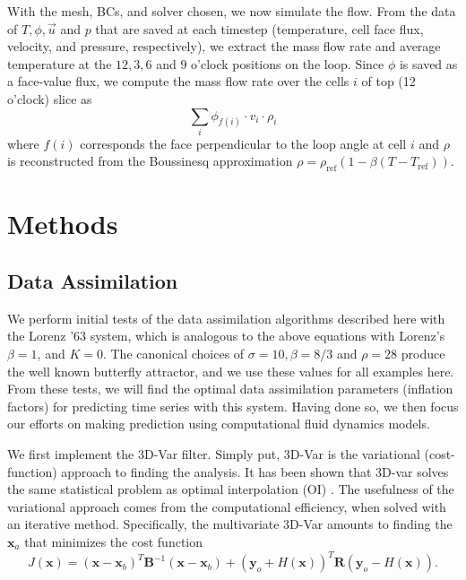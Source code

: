 \documentclass[10pt,letterpaper]{article}
\newcommand{\rhoref}{\rho_{\text{ref}}}
\newcommand{\mbx}{\mathbf{x}}
\newcommand{\mby}{\mathbf{y}}
\newcommand{\mbB}{\mathbf{B}}
\newcommand{\mbR}{\mathbf{R}}
\begin{document}
With the mesh, BCs, and solver chosen, we now simulate the flow.
From the data of $T,\phi,\vec{u}$ and $p$ that are saved at each timestep (temperature, cell face flux, velocity, and pressure, respectively), we extract the mass flow rate and average temperature at the $12,3,6$ and $9$ o'clock positions on the loop.
Since $\phi$ is saved as a face-value flux, we compute the mass flow rate over the cells $i$ of top (12 o'clock) slice as
\begin{equation} \sum _i\phi_{f(i)} \cdot v_i \cdot \rho_i\end{equation}
where $f(i)$ corresponds the face perpendicular to the loop angle at cell $i$ and $\rho$ is reconstructed from the Boussinesq approximation $\rho = \rhoref (1-\beta(T-T_\text{ref}))$.

\section*{Methods}

\subsection*{Data Assimilation}

We perform initial tests of the data assimilation algorithms described here with the Lorenz '63 system, which is analogous to the above equations with Lorenz's $\beta = 1$, and $K = 0$.
The canonical choices of $\sigma = 10, \beta = 8/3$ and $\rho = 28$ produce the well known butterfly attractor, and we use these values for all examples here.
From these tests, we will find the optimal data assimilation parameters (inflation factors) for predicting time series with this system.
Having done so, we then focus our efforts on making prediction using computational fluid dynamics models.

We first implement the 3D-Var filter.
Simply put, 3D-Var is the variational (cost-function) approach to finding the analysis.
It has been shown that 3D-var solves the same statistical problem as optimal interpolation (OI) \cite{lorenc1986analysis}.
The usefulness of the variational approach comes from the computational efficiency, when solved with an iterative method.
Specifically, the multivariate 3D-Var amounts to finding the $\mbx _a$ that minimizes the cost function
\begin{equation} J(\mbx) = (\mbx - \mbx_b) ^T \mbB ^{-1} (\mbx - \mbx_b) + (\mby_o + H(\mbx))^T\mbR (\mby_o - H(\mbx)) .\end{equation}
\end{document}
